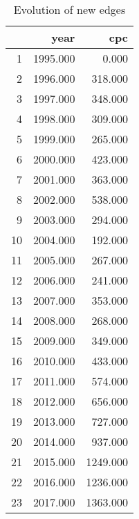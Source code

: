 \begin{table}[ht]
\centering
\begin{tabular}{rrr}
  \hline
 & year & cpc \\ 
  \hline
1 & 1995.000 & 0.000 \\ 
  2 & 1996.000 & 318.000 \\ 
  3 & 1997.000 & 348.000 \\ 
  4 & 1998.000 & 309.000 \\ 
  5 & 1999.000 & 265.000 \\ 
  6 & 2000.000 & 423.000 \\ 
  7 & 2001.000 & 363.000 \\ 
  8 & 2002.000 & 538.000 \\ 
  9 & 2003.000 & 294.000 \\ 
  10 & 2004.000 & 192.000 \\ 
  11 & 2005.000 & 267.000 \\ 
  12 & 2006.000 & 241.000 \\ 
  13 & 2007.000 & 353.000 \\ 
  14 & 2008.000 & 268.000 \\ 
  15 & 2009.000 & 349.000 \\ 
  16 & 2010.000 & 433.000 \\ 
  17 & 2011.000 & 574.000 \\ 
  18 & 2012.000 & 656.000 \\ 
  19 & 2013.000 & 727.000 \\ 
  20 & 2014.000 & 937.000 \\ 
  21 & 2015.000 & 1249.000 \\ 
  22 & 2016.000 & 1236.000 \\ 
  23 & 2017.000 & 1363.000 \\ 
   \hline
\end{tabular}
\caption{Evolution of new edges} 
\end{table}
